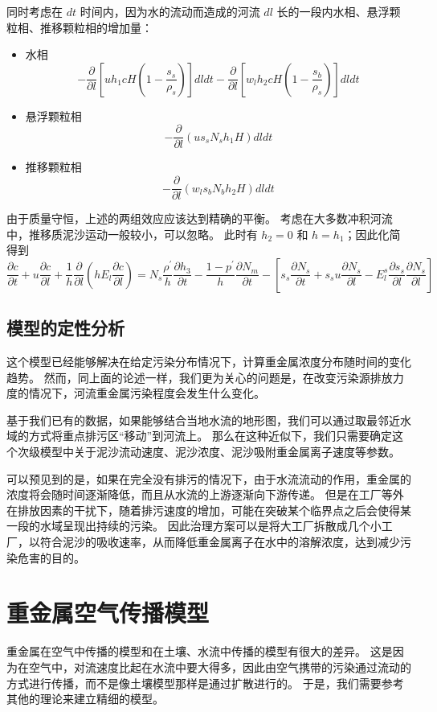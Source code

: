 \documentclass[a4paper]{article}
\begin{document}
同时考虑在 $dt$ 时间内，因为水的流动而造成的河流 $dl$ 长的一段内水相、悬浮颗粒相、推移颗粒相的增加量：
\begin{itemize}
	\item 水相
		$$ -\frac{\partial}{\partial l}\left[uh_1cH\left(1-\frac{s_s}{\rho_s}\right)\right]dldt -\frac{\partial}{\partial l}\left[w_lh_2cH\left(1-\frac{s_b}{\rho_s}\right)\right]dldt $$
	\item 悬浮颗粒相
		$$ -\frac{\partial}{\partial l}(us_sN_sh_1H)dldt $$
	\item 推移颗粒相
		$$ -\frac{\partial}{\partial l}(w_ls_bN_bh_2H)dldt $$
\end{itemize}

由于质量守恒，上述的两组效应应该达到精确的平衡。
考虑在大多数冲积河流中，推移质泥沙运动一般较小，可以忽略。
此时有 $h_2 = 0$ 和 $h = h_1$；因此化简得到
$$ \frac{\partial c}{\partial t} + u\frac{\partial c}{\partial l} + \frac{1}{h} \frac{\partial}{\partial l}\left(h E_l \frac{\partial c}{\partial l}\right) = N_s \frac{\rho^{'}}{h} \frac{\partial h_3}{\partial t} - \frac{1 - p^{'}}{h}\frac{\partial N_m}{\partial t} - \left[ s_s\frac{\partial N_s}{\partial t} + s_s u \frac{\partial N_s}{\partial l} -E_l^s\frac{\partial s_s}{\partial l}\frac{\partial N_s}{\partial l} \right]$$

\subsection{模型的定性分析}
这个模型已经能够解决在给定污染分布情况下，计算重金属浓度分布随时间的变化趋势。
然而，同上面的论述一样，我们更为关心的问题是，在改变污染源排放力度的情况下，河流重金属污染程度会发生什么变化。

基于我们已有的数据，如果能够结合当地水流的地形图，我们可以通过取最邻近水域的方式将重点排污区“移动”到河流上。
那么在这种近似下，我们只需要确定这个次级模型中关于泥沙流动速度、泥沙浓度、泥沙吸附重金属离子速度等参数。

可以预见到的是，如果在完全没有排污的情况下，由于水流流动的作用，重金属的浓度将会随时间逐渐降低，而且从水流的上游逐渐向下游传递。
但是在工厂等外在排放因素的干扰下，随着排污速度的增加，可能在突破某个临界点之后会使得某一段的水域呈现出持续的污染。
因此治理方案可以是将大工厂拆散成几个小工厂，以符合泥沙的吸收速率，从而降低重金属离子在水中的溶解浓度，达到减少污染危害的目的。

\section{重金属空气传播模型}
重金属在空气中传播的模型和在土壤、水流中传播的模型有很大的差异。
这是因为在空气中，对流速度比起在水流中要大得多，因此由空气携带的污染通过流动的方式进行传播，而不是像土壤模型那样是通过扩散进行的。
于是，我们需要参考其他的理论来建立精细的模型。
\end{document}
